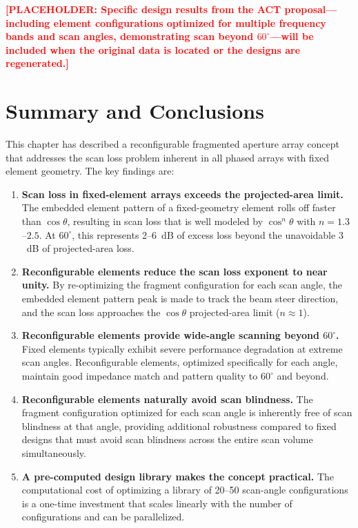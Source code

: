 \textcolor{red}{\textbf{[PLACEHOLDER: Specific design results from the ACT proposal---including element configurations optimized for multiple frequency bands and scan angles, demonstrating scan beyond $60^{\circ}$---will be included when the original data is located or the designs are regenerated.]}}

\section{Summary and Conclusions}

This chapter has described a reconfigurable fragmented aperture array concept that addresses the scan loss problem inherent in all phased arrays with fixed element geometry.  The key findings are:

\begin{enumerate}

\item \textbf{Scan loss in fixed-element arrays exceeds the projected-area limit.}  The embedded element pattern of a fixed-geometry element rolls off faster than $\cos\theta$, resulting in scan loss that is well modeled by $\cos^n\theta$ with $n = 1.3$--$2.5$.  At $60^{\circ}$, this represents 2--6~dB of excess loss beyond the unavoidable $3$~dB of projected-area loss.

\item \textbf{Reconfigurable elements reduce the scan loss exponent to near unity.}  By re-optimizing the fragment configuration for each scan angle, the embedded element pattern peak is made to track the beam steer direction, and the scan loss approaches the $\cos\theta$ projected-area limit ($n \approx 1$).

\item \textbf{Reconfigurable elements provide wide-angle scanning beyond $60^{\circ}$.}  Fixed elements typically exhibit severe performance degradation at extreme scan angles.  Reconfigurable elements, optimized specifically for each angle, maintain good impedance match and pattern quality to $60^{\circ}$ and beyond.

\item \textbf{Reconfigurable elements naturally avoid scan blindness.}  The fragment configuration optimized for each scan angle is inherently free of scan blindness at that angle, providing additional robustness compared to fixed designs that must avoid scan blindness across the entire scan volume simultaneously.

\item \textbf{A pre-computed design library makes the concept practical.}  The computational cost of optimizing a library of 20--50 scan-angle configurations is a one-time investment that scales linearly with the number of configurations and can be parallelized.

\end{enumerate}

